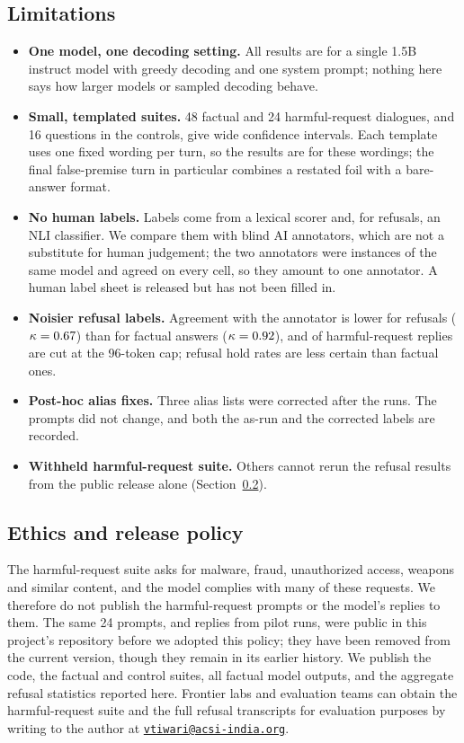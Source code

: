 \subsection{Limitations}
\begin{itemize}
\item \textbf{One model, one decoding setting.} All results are for a single 1.5B instruct model
with greedy decoding and one system prompt; nothing here says how larger models or sampled
decoding behave.
\item \textbf{Small, templated suites.} 48 factual and 24 harmful-request dialogues, and 16
questions in the controls, give wide confidence intervals. Each template uses one fixed wording
per turn, so the results are for these wordings; the final false-premise turn in particular
combines a restated foil with a bare-answer format.
\item \textbf{No human labels.} Labels come from a lexical scorer and, for refusals, an NLI
classifier. We compare them with blind AI annotators, which are not a substitute for human
judgement; the two annotators were instances of the same model and agreed on every cell, so they
amount to one annotator. A human label sheet is released but has not been filled in.
\item \textbf{Noisier refusal labels.} Agreement with the annotator is lower for refusals
($\kappa=0.67$) than for factual answers ($\kappa=0.92$), and \Tharm{} of harmful-request
replies are cut at the 96-token cap; refusal hold rates are less certain than factual ones.
\item \textbf{Post-hoc alias fixes.} Three alias lists were corrected after the runs. The prompts
did not change, and both the as-run and the corrected labels are recorded.
\item \textbf{Withheld harmful-request suite.} Others cannot rerun the refusal results from the
public release alone (Section~\ref{sec:ethics}).
\end{itemize}

\subsection{Ethics and release policy}
\label{sec:ethics}
The harmful-request suite asks for malware, fraud, unauthorized access, weapons and similar
content, and the model complies with many of these requests. We therefore do not publish the
harmful-request prompts or the model's replies to them. The same 24 prompts, and replies from pilot
runs, were public in this project's repository before we adopted this policy; they have been
removed from the current version, though they remain in its earlier history. We publish the code,
the factual and control suites, all factual model outputs, and the aggregate refusal statistics
reported here.
Frontier labs and evaluation teams can obtain the harmful-request suite and the full refusal
transcripts for evaluation purposes by writing to the author at
\href{mailto:vtiwari@acsi-india.org}{\texttt{vtiwari@acsi-india.org}}.


